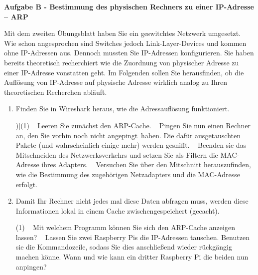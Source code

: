 \documentclass[paper=a4,fontsize=11pt]{scrartcl}%
\numberwithin{equation}{section}
\begin{document}
\begin{center}
\Large{\textbf{Aufgabe B - Bestimmung des physischen Rechners zu einer IP-Adresse -- ARP}}
\end{center}\vskip0.25in
Mit dem zweiten Übungsblatt haben Sie ein geswitchtes Netzwerk umgesetzt. Wie schon angesprochen sind Switches jedoch Link-Layer-Devices und kommen ohne IP-Adressen aus. Dennoch mussten Sie IP-Adressen konfigurieren. Sie haben bereits theoretisch recherchiert wie die Zuordnung von physischer Adresse zu einer IP-Adresse vonstatten geht. Im Folgenden sollen Sie herausfinden, ob die Auflösung von IP-Adresse auf physische Adresse wirklich analog zu Ihren theoretischen Recherchen abläuft.
\begin{enumerate}
\item Finden Sie in Wireshark heraus, wie die Adressauflösung funktioniert.
\begin{tasks}[counter-format=(tsk[r])](1)
	\task~ Leeren Sie zunächst den ARP-Cache.
	\task~ Pingen Sie nun einen Rechner an, den Sie vorhin noch nicht \glqq angepingt\grqq\ haben. Die dafür ausgetauschten Pakete (und wahrscheinlich einige mehr) werden \glqq gesnifft\grqq.
	\task~ Beenden sie das Mitschneiden des Netzwerksverkehrs und setzen Sie als Filtern die MAC-Adresse ihres Adapters.
	\task~ Versuchen Sie über den Mitschnitt herauszufinden, wie die Bestimmung des zugehörigen Netzadapters und die MAC-Adresse erfolgt.
\end{tasks}
\item Damit Ihr Rechner nicht jedes mal diese Daten abfragen muss, werden diese Informationen lokal in einem Cache zwischengespeichert (\glqq gecacht\grqq).
\begin{tasks}(1)
	\task~ Mit welchem Programm können Sie sich den ARP-Cache anzeigen lassen?
	\task~ Lassen Sie zwei Raspberry Pis die IP-Adressen tauschen. Benutzen sie die Kommandozeile, sodass Sie dies anschließend wieder rückgängig machen könne. Wann und wie kann ein dritter Raspberry Pi die beiden nun \glqq anpingen\grqq?
\end{tasks}
\end{enumerate}
\end{document}
